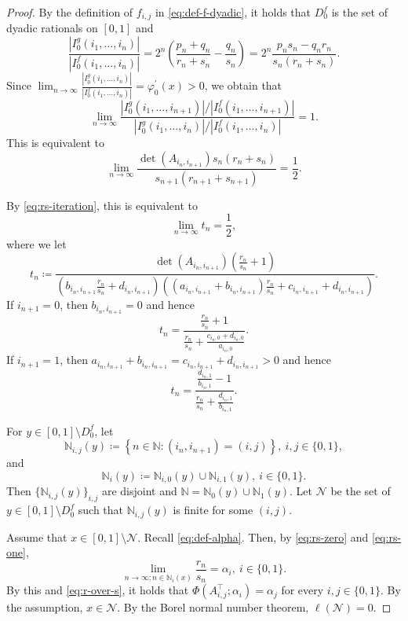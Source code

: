 \documentclass[a4paper, reqno, 11pt]{amsart}
\theoremstyle{definition}
\begin{document}
\begin{proof}
By the definition of $f_{i,j}$ in \eqref{eq:def-f-dyadic}, it holds that $D^{f}_{0}$ is the set of dyadic rationals on $[0,1]$ and 
\[ \frac{|I^{g}_{0} (i_1, \dots, i_n)|}{|I^{f}_{0} (i_1, \dots, i_n)|} = 2^n \left( \frac{p_n + q_n}{r_n + s_n} - \frac{q_n}{s_n} \right) = 2^n \frac{p_n s_n - q_n r_n}{s_n (r_n + s_n)}. \]
Since 
$\displaystyle \lim_{n \to \infty} \frac{|I^{g}_{0} (i_1, \dots, i_n)|}{|I^{f}_{0} (i_1, \dots, i_n)|}  = \varphi_0^{\prime}(x) > 0$, 
we obtain that 
\[ \lim_{n \to \infty} \frac{|I^{g}_{0} (i_1, \dots, i_{n+1})| / |I^{f}_{0} (i_1, \dots, i_{n+1})| }{|I^{g}_{0} (i_1, \dots, i_n)| / |I^{f}_{0} (i_1, \dots, i_n)| } = 1. \]
This is equivalent to  
\[ \lim_{n \to \infty} \frac{\det(A_{i_n, i_{n+1}}) s_n (r_n + s_n)}{s_{n+1} (r_{n+1} + s_{n+1})} = \frac{1}{2}. \]

By \eqref{eq:rs-iteration}, this is equivalent to  
\[ \lim_{n \to \infty} t_n = \frac{1}{2}, \]
where we let 
\[ t_n \coloneqq \frac{\det(A_{i_n, i_{n+1}}) (\frac{r_n}{s_n} + 1)}{(b_{i_n, i_{n+1}} \frac{r_{n}}{s_n} + d_{i_n, i_{n+1}}) ((a_{i_n, i_{n+1}} + b_{i_n, i_{n+1}}) \frac{r_{n}}{s_n} + c_{i_n, i_{n+1}} + d_{i_n, i_{n+1}})}. \]
If $i_{n+1} = 0$, then $b_{i_n, i_{n+1}} = 0$ and hence 
\begin{equation}\label{eq:rs-zero} 
t_n = \frac{\frac{r_n}{s_n} + 1}{\frac{r_n}{s_n} + \frac{c_{i_n, 0} + d_{i_n, 0}}{a_{i_n, 0}}}. 
\end{equation} 
If $i_{n+1} = 1$, then $a_{i_n, i_{n+1}} + b_{i_n, i_{n+1}} = c_{i_n, i_{n+1}} + d_{i_n, i_{n+1}} > 0$ and hence 
\begin{equation}\label{eq:rs-one} 
t_n = \frac{\frac{d_{i_n,1}}{b_{i_n,1}} - 1}{\frac{r_n}{s_n} + \frac{d_{i_n, 1}}{b_{i_n, 1}}}. 
\end{equation}



For $y \in [0,1] \setminus  D_0^f$, let 
\[ \mathbb{N}_{i,j}(y) \coloneqq \left\{n \in \mathbb{N} \colon (i_n, i_{n+1}) = (i,j) \right\}, \ i, j \in \{0,1\},  \]
and 
\[ \mathbb{N}_{i}(y) \coloneqq \mathbb{N}_{i,0}(y) \cup \mathbb{N}_{i,1}(y), \ i \in \{0,1\}.  \]
Then $\{\mathbb{N}_{i,j}(y)\}_{i,j}$ are disjoint and $\mathbb{N} = \mathbb{N}_{0}(y) \cup \mathbb{N}_{1}(y)$. 
Let $\mathcal{N}$ be the set of $y \in [0,1] \setminus  D_0^f$ such that $\mathbb{N}_{i,j}(y)$ is finite for some $(i, j)$. 

Assume that $x \in [0,1] \setminus  \mathcal{N}$. 
Recall \eqref{eq:def-alpha}. 
Then, 
by \eqref{eq:rs-zero} and \eqref{eq:rs-one}, 
\[ \lim_{n \to \infty; n \in \mathbb{N}_i (x)} \frac{r_n}{s_n} = \alpha_i, \ i \in \{0,1\}.  \]
By this and \eqref{eq:r-over-s}, 
it holds that 
$\Phi \left(A_{i,j}^{\top}; \alpha_i \right) = \alpha_j$ for every $i, j \in \{0,1\}$. 
By the assumption, $x \in \mathcal{N}$. 
By the Borel normal number theorem, $\ell(\mathcal{N}) = 0$. 


\end{proof}
\end{document}
